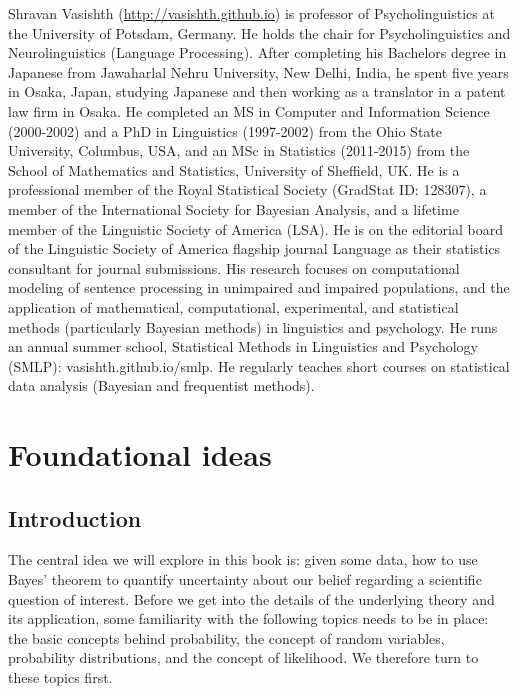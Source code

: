 \documentclass[12pt,]{krantz}
\theoremstyle{definition}
\theoremstyle{definition}
\theoremstyle{definition}
\theoremstyle{remark}
\begin{document}
Shravan Vasishth (\url{http://vasishth.github.io}) is professor of
Psycholinguistics at the University of Potsdam, Germany. He holds the
chair for Psycholinguistics and Neurolinguistics (Language Processing).
After completing his Bachelors degree in Japanese from Jawaharlal Nehru
University, New Delhi, India, he spent five years in Osaka, Japan,
studying Japanese and then working as a translator in a patent law firm
in Osaka. He completed an MS in Computer and Information Science
(2000-2002) and a PhD in Linguistics (1997-2002) from the Ohio State
University, Columbus, USA, and an MSc in Statistics (2011-2015) from the
School of Mathematics and Statistics, University of Sheffield, UK. He is
a professional member of the Royal Statistical Society (GradStat ID:
128307), a member of the International Society for Bayesian Analysis,
and a lifetime member of the Linguistic Society of America (LSA). He is
on the editorial board of the Linguistic Society of America flagship
journal Language as their statistics consultant for journal submissions.
His research focuses on computational modeling of sentence processing in
unimpaired and impaired populations, and the application of
mathematical, computational, experimental, and statistical methods
(particularly Bayesian methods) in linguistics and psychology. He runs
an annual summer school, Statistical Methods in Linguistics and
Psychology (SMLP): vasishth.github.io/smlp. He regularly teaches short
courses on statistical data analysis (Bayesian and frequentist methods).

\mainmatter

\part{Foundational ideas}\label{part-foundational-ideas}

\chapter{Introduction}\label{introduction}

The central idea we will explore in this book is: given some data, how
to use Bayes' theorem to quantify uncertainty about our belief regarding
a scientific question of interest. Before we get into the details of the
underlying theory and its application, some familiarity with the
following topics needs to be in place: the basic concepts behind
probability, the concept of random variables, probability distributions,
and the concept of likelihood. We therefore turn to these topics first.
\end{document}
